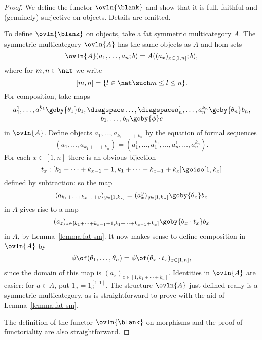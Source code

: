 \begin{proof}
We define the functor $\ovln{\blank}$ and show that it is full, faithful
and (genuinely) surjective on objects.  Details are omitted.

To define $\ovln{\blank}$ on objects, take a fat symmetric multicategory
$A$.  The symmetric multicategory $\ovln{A}$ has the same objects as $A$
and hom-sets 
\[
\ovln{A} (a_1, \ldots, a_n; b) 
=
A((a_x)_{x\in [1,n]}; b),
\]
where for $m,n\in \nat$ we write 
\[
[m,n] = \{ l \in \nat \such m \leq l \leq n \}.
\]
For composition, take maps
\[
\begin{array}{c}
a_1^1, \ldots, a_1^{k_1} \goby{\theta_1} b_1,
\diagspace \ldots, \diagspace 
a_n^1, \ldots, a_n^{k_n} \goby{\theta_n} b_n,	\\
b_1, \ldots, b_n \goby{\phi} c
\end{array}
\]
in $\ovln{A}$.  Define objects $a_1, \ldots, a_{k_1 + \cdots + k_n}$ by the
equation of formal sequences
\[
(a_1, \ldots, a_{k_1 + \cdots + k_n}) 
=
(a_1^1, \ldots, a_1^{k_1}, \ldots, a_n^1, \ldots, a_n^{k_n}).
\]
For each $x\in [1,n]$ there is an obvious bijection
\[
t_x: 
[k_1 + \cdots + k_{x-1} + 1, k_1 + \cdots + k_{x-1} + k_x]
\goiso
[1, k_x]
\]
defined by subtraction: so the map 
\[
(a_{k_1 + \cdots + k_{x-1} + y})_{y\in [1,k_x]}
=
(a_x^y)_{y\in [1,k_n]}
\goby{\theta_x}
b_x
\]
in $A$ gives rise to a map
\[
(a_z)_{z\in [k_1 + \cdots + k_{x-1} + 1, k_1 + \cdots + k_{x-1} + k_x]}
\goby{\theta_x \cdot t_x}
b_x
\]
in $A$, by Lemma~\ref{lemma:fat-sm}.  It now makes sense to define
composition in $\ovln{A}$ by
\[
\phi \of (\theta_1, \ldots, \theta_n)
=
\phi \of (\theta_x \cdot t_x)_{x\in [1,n]},
\]
since the domain of this map is $(a_z)_{z\in [1, k_1 + \cdots + k_n]}$.
Identities in $\ovln{A}$ are easier: for $a\in A$, put $1_a =
1_a^{[1,1]}$.  The structure $\ovln{A}$ just defined really is a symmetric
multicategory, as is straightforward to prove with the aid of
Lemma~\ref{lemma:fat-sm}.  

The definition of the functor $\ovln{\blank}$ on morphisms and the proof
of functoriality are also straightforward.


\end{proof}
